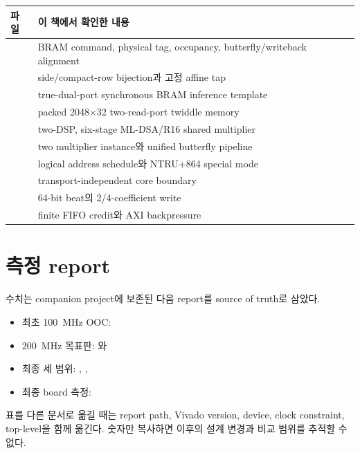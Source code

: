 \begin{longtable}{L{58mm}L{104mm}}
\toprule
파일 & 이 책에서 확인한 내용 \\
\midrule
{} & BRAM command, physical tag, occupancy, butterfly/writeback alignment \\
 & side/compact-row bijection과 고정 affine tap \\
 & true-dual-port synchronous BRAM inference template \\
 & packed 2048$\times$32 two-read-port twiddle memory \\
 & two-DSP, six-stage ML-DSA/R16 shared multiplier \\
 & two multiplier instance와 unified butterfly pipeline \\
 & logical address schedule와 NTRU+864 special mode \\
 & transport-independent core boundary \\
 & 64-bit beat의 2/4-coefficient write \\
 & finite FIFO credit와 AXI backpressure \\
\bottomrule
\end{longtable}

\section{측정 report}

수치는 companion project에 보존된 다음 report를 source of truth로 삼았다.

\begin{itemize}
  \item 최초 100~MHz OOC: 
  \item 200~MHz 목표판: 와
  \item 최종 세 범위: ,
        , 
  \item 최종 board 측정:
\end{itemize}

표를 다른 문서로 옮길 때는 report path, Vivado version, device, clock constraint,
top-level을 함께 옮긴다. 숫자만 복사하면 이후의 설계 변경과 비교 범위를 추적할
수 없다.


